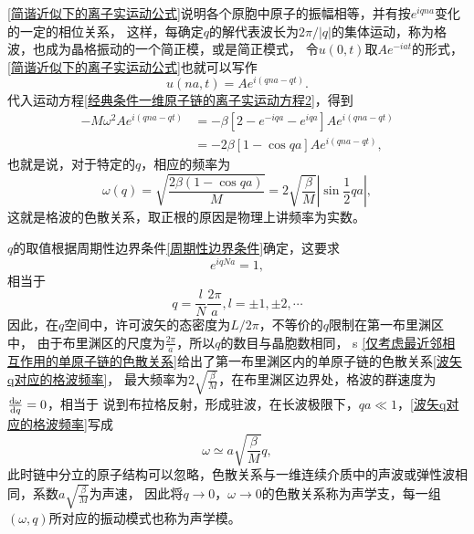             \autoref{简谐近似下的离子实运动公式}说明各个原胞中原子的振幅相等，并有按$e^{iqna}$变化的一定的相位关系，
            这样，每确定$q$的解代表波长为$2\pi/|q|$的集体运动，称为格波，也成为晶格振动的一个简正模，或是简正模式，
            令$u(0,t)$取$Ae^{-iat}$的形式，\autoref{简谐近似下的离子实运动公式}也就可以写作
            \begin{equation}
                u(na,t)=Ae^{i(qna-qt)}.
            \end{equation}
            代入运动方程\autoref{经典条件一维原子链的离子实运动方程2}，得到
            \begin{equation}
                \begin{aligned}
                    -M\omega^2Ae^{i(qna-qt)}&=-\beta[2-e^{-iqa}-e^{iqa}]Ae^{i(qna-qt)}\\
                    &=-2\beta[1-\cos{qa}]Ae^{i(qna-qt)},
                \end{aligned}
            \end{equation}
            也就是说，对于特定的$q$，相应的频率为
            \begin{equation}
                \omega(q)=\sqrt{\frac{2\beta(1-\cos{qa})}{M}}=2\sqrt{\frac{\beta}{M}}\left\vert \sin{\frac{1}{2}qa}\right\vert\label{波矢q对应的格波频率},
            \end{equation}
            这就是格波的色散关系，取正根的原因是物理上讲频率为实数。

            $q$的取值根据周期性边界条件\autoref{周期性边界条件}确定，这要求
            \begin{equation}
                e^{iqNa}=1,
            \end{equation}
            相当于
            \begin{equation}
                q=\frac{l}{N}\frac{2\pi}{a},l=\pm1,\pm2,\cdots
            \end{equation}
            因此，在$q$空间中，许可波矢的态密度为$L/2\pi$，不等价的$q$限制在第一布里渊区中，
            由于布里渊区的尺度为$\frac{2\pi}{a}$，所以$q$的数目与晶胞数相同，
            s
            \autoref{仅考虑最近邻相互作用的单原子链的色散关系}给出了第一布里渊区内的单原子链的色散关系\autoref{波矢q对应的格波频率}，
            最大频率为$2\sqrt{\frac{\beta}{M}}$，在布里渊区边界处，格波的群速度为$\frac{\mathop{}\!\mathrm{d} \omega}{\mathop{}\!\mathrm{d} q}=0$，相当于
            说到布拉格反射，形成驻波，在长波极限下，$qa\ll1$，\autoref{波矢q对应的格波频率}写成
            \begin{equation}
                \omega\simeq a\sqrt{\frac{\beta}{M}}q,
            \end{equation}
            此时链中分立的原子结构可以忽略，色散关系与一维连续介质中的声波或弹性波相同，系数$a\sqrt{\frac{\beta}{M}}$为声速，
            因此将$q\to0$，$\omega\to0$的色散关系称为声学支，每一组$(\omega,q)$所对应的振动模式也称为声学模。

